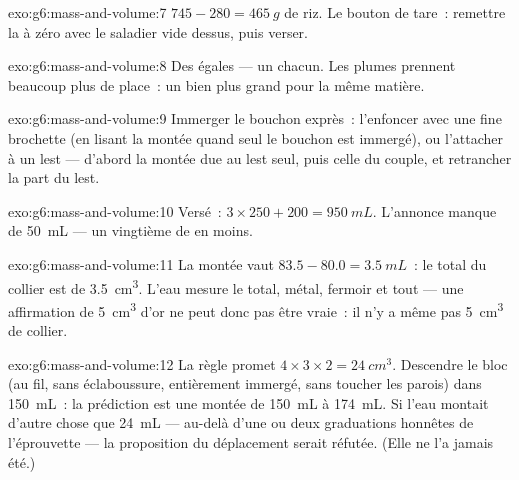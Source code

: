 \begin{solution}{exo:g6:mass-and-volume:7}
$745 - 280 = \qty{465}{g}$ de riz. Le bouton de tare~: remettre la
 à zéro avec le saladier vide dessus, puis verser.
\end{solution}

\begin{solution}{exo:g6:mass-and-volume:8}
Des  égales --- un  chacun. Les plumes prennent
beaucoup plus de place~: un  bien plus grand pour la même
matière.
\end{solution}

\begin{solution}{exo:g6:mass-and-volume:9}
Immerger le bouchon exprès~: l'enfoncer avec une fine brochette (en
lisant la montée quand seul le bouchon est immergé), ou l'attacher à
un lest ---  d'abord la montée due au lest seul, puis celle du
couple, et retrancher la part du lest.
\end{solution}

\begin{solution}{exo:g6:mass-and-volume:10}
Versé~: $3 \times 250 + 200 = \qty{950}{mL}$. L'annonce manque de
\qty{50}{mL} --- un vingtième de  en moins.
\end{solution}

\begin{solution}{exo:g6:mass-and-volume:11}
La montée vaut $83.5 - 80.0 = \qty{3.5}{mL}$~: le  total du
collier est de \qty{3.5}{cm^3}. L'eau mesure le  total, métal,
fermoir et tout --- une affirmation de \qty{5}{cm^3} d'or ne peut
donc pas être vraie~: il n'y a même pas \qty{5}{cm^3} de collier.
\end{solution}

\begin{solution}{exo:g6:mass-and-volume:12}
La règle promet $4 \times 3 \times 2 = \qty{24}{cm^3}$. Descendre le
bloc (au fil, sans éclaboussure, entièrement immergé, sans toucher
les parois) dans \qty{150}{mL}~: la prédiction est une montée de
\qty{150}{mL} à \qty{174}{mL}. Si l'eau montait d'autre chose que
\qty{24}{mL} --- au-delà d'une ou deux graduations honnêtes de
l'éprouvette --- la proposition du déplacement serait réfutée. (Elle
ne l'a jamais été.)
\end{solution}

